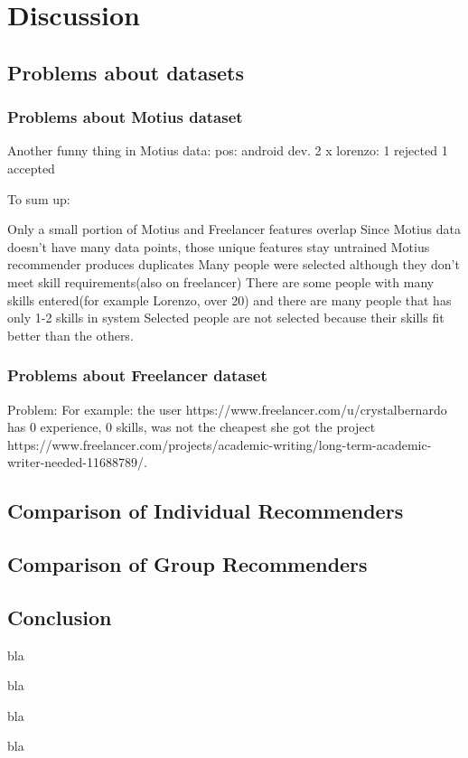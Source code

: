 
\chapter{Discussion}\label{chapter:discussion}

\section{Problems about datasets}

\subsection{Problems about Motius dataset}

Another funny thing in Motius data: pos: android dev. 2 x lorenzo: 1 rejected 1 accepted

To sum up:

Only a small portion of Motius and Freelancer features overlap
Since Motius data doesn't have many data points, those unique features stay untrained
Motius recommender produces duplicates
Many people were selected although they don't meet skill requirements(also on freelancer)
There are some people with many skills entered(for example Lorenzo, over 20) and there are many people that has only 1-2 skills in system
Selected people are not selected because their skills fit better than the others.

\subsection{Problems about Freelancer dataset}

Problem: For example: the user https://www.freelancer.com/u/crystalbernardo has 0 experience, 0 skills, was not the cheapest she got the project https://www.freelancer.com/projects/academic-writing/long-term-academic-writer-needed-11688789/.

\section{Comparison of Individual Recommenders}

\section{Comparison of Group Recommenders}


\section{Conclusion}

bla

bla

bla

bla